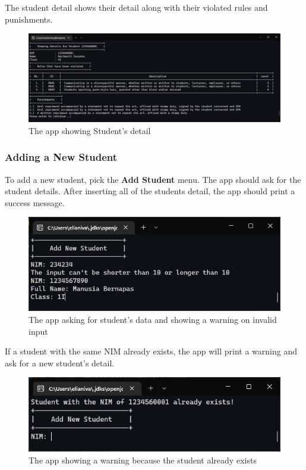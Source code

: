 \documentclass[12pt,titlepage]{article}
\begin{document}
The student detail shows their detail along with their violated rules and punishments.

\begin{figure}[h]
    \centering
    \includegraphics[width=.8\textwidth]{images/show-detail.png}
    \caption{The app showing Student's detail}
\end{figure}

\pagebreak

\subsubsection{Adding a New Student}
To add a new student, pick the \textbf{Add Student} menu. The app should ask for the student details.
After inserting all of the students detail, the app should print a success message.

\begin{figure}[h]
    \centering
    \includegraphics[width=.8\textwidth]{images/add-student-input.png}
    \caption{The app asking for student's data and showing a warning on invalid input}
\end{figure}

If a student with the same NIM already exists, the app will print a warning and ask for a new student's detail.

\begin{figure}[h]
    \centering
    \includegraphics[width=.8\textwidth]{images/add-student-warning.png}
    \caption{The app showing a warning because the student already exists}
\end{figure}
\end{document}

